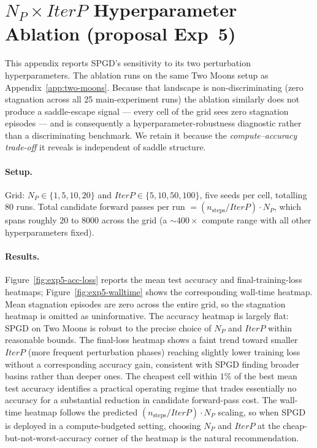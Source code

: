\documentclass[11pt]{article}
\newcommand{\np}{\ensuremath{N_P}}
\newcommand{\iterp}{\ensuremath{\textit{IterP}}}
\begin{document}
\section{$\np \times \iterp$ Hyperparameter Ablation (proposal Exp~5)}
\label{app:ablation}
\label{sec:exp5}

This appendix reports SPGD's sensitivity to its two perturbation
hyperparameters.  The ablation runs on the same Two Moons setup as
Appendix~\ref{app:two-moons}.  Because that landscape is
non-discriminating (zero stagnation across all 25 main-experiment
runs) the ablation similarly does not produce a saddle-escape
signal --- every cell of the grid sees zero stagnation episodes ---
and is consequently a hyperparameter-robustness diagnostic rather
than a discriminating benchmark.  We retain it because the
\emph{compute--accuracy trade-off} it reveals is independent of
saddle structure.

\paragraph{Setup.} Grid: $\np \in \{1, 5, 10, 20\}$ and
$\iterp \in \{5, 10, 50, 100\}$, five seeds per cell, totalling 80
runs.  Total candidate forward passes per run
$= (n_{\text{steps}} / \iterp{}) \cdot \np{}$, which spans roughly
$20$ to $8000$ across the grid (a $\sim 400\times$ compute range
with all other hyper\-parameters fixed).

\paragraph{Results.} Figure~\ref{fig:exp5-acc-loss} reports the mean
test accuracy and final-training-loss heatmaps;
Figure~\ref{fig:exp5-walltime} shows the corresponding wall-time
heatmap.  Mean stagnation episodes are zero across the entire grid,
so the stagnation heatmap is omitted as uninformative.  The accuracy
heatmap is largely flat: SPGD on Two Moons is robust to the precise
choice of \np{} and \iterp{} within reasonable bounds.  The
final-loss heatmap shows a faint trend toward smaller \iterp{} (more
frequent perturbation phases) reaching slightly lower training loss
without a corresponding accuracy gain, consistent with SPGD finding
broader basins rather than deeper ones.  The cheapest cell within
$1\%$ of the best mean test accuracy identifies a practical operating
regime that trades essentially no accuracy for a substantial reduction
in candidate forward-pass cost.  The wall-time heatmap follows the
predicted $(n_{\text{steps}}/\iterp{}) \cdot \np{}$ scaling, so when
SPGD is deployed in a compute-budgeted setting, choosing $\np{}$ and
$\iterp{}$ at the cheap-but-not-worst-accuracy corner of the heatmap
is the natural recommendation.
\end{document}
